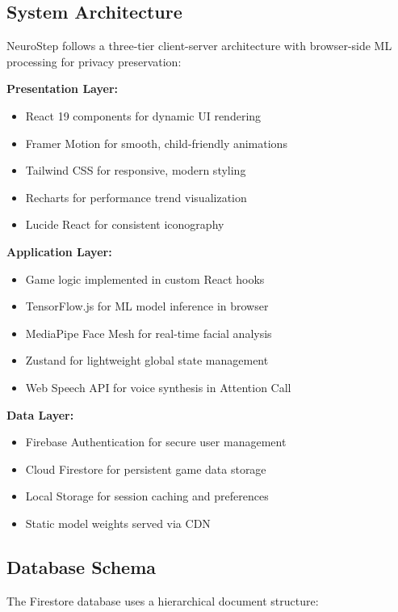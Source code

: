 \documentclass[12pt,letterpaper]{article}
\begin{document}
\subsection{System Architecture}

NeuroStep follows a three-tier client-server architecture with browser-side ML processing for privacy preservation:

\textbf{Presentation Layer:}
\begin{itemize}
    \item React 19 components for dynamic UI rendering
    \item Framer Motion for smooth, child-friendly animations
    \item Tailwind CSS for responsive, modern styling
    \item Recharts for performance trend visualization
    \item Lucide React for consistent iconography
\end{itemize}

\textbf{Application Layer:}
\begin{itemize}
    \item Game logic implemented in custom React hooks
    \item TensorFlow.js for ML model inference in browser
    \item MediaPipe Face Mesh for real-time facial analysis
    \item Zustand for lightweight global state management
    \item Web Speech API for voice synthesis in Attention Call
\end{itemize}

\textbf{Data Layer:}
\begin{itemize}
    \item Firebase Authentication for secure user management
    \item Cloud Firestore for persistent game data storage
    \item Local Storage for session caching and preferences
    \item Static model weights served via CDN
\end{itemize}

\subsection{Database Schema}

The Firestore database uses a hierarchical document structure:
\end{document}
